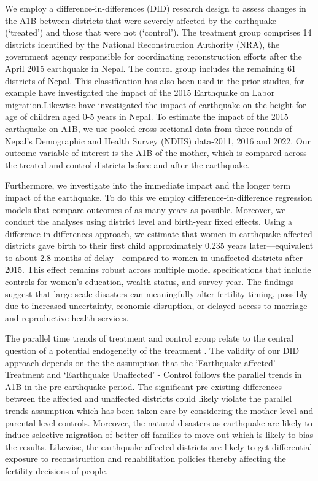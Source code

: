 \documentclass[11pt,a4paper]{article}
\begin{document}
We employ a difference-in-differences (DID) research design to assess changes in the A1B between districts that were severely affected by the earthquake (`treated') and those that were not (`control'). The treatment group comprises 14 districts identified by the National Reconstruction Authority (NRA), the government agency responsible for coordinating reconstruction efforts after the April 2015 earthquake in Nepal. The control group includes the remaining 61 districts of Nepal. This classification has also been used in the prior studies, for example \citet{shakya2022natural} have investigated the impact of the 2015 Earthquake on Labor migration.Likewise \citet{pun2023impact} have investigated the impact of earthquake on the height-for-age of children aged 0-5 years in Nepal. To estimate the impact of the 2015 earthquake on A1B, we use pooled cross-sectional data from three rounds of Nepal's Demographic and Health Survey (NDHS) data-2011, 2016 and 2022. Our outcome variable of interest is the A1B of the mother, which is compared across the treated and control districts before and after the earthquake. 

\vspace{0.25 cm}

Furthermore, we investigate into the immediate impact and the longer term impact of the earthquake. To do this we employ difference-in-difference regression models that compare outcomes of as many years as possible. Moreover, we conduct the analyses using district level and birth-year fixed effects. Using a difference-in-differences approach, we estimate that women in earthquake-affected districts gave birth to their first child approximately 0.235 years later—equivalent to about 2.8 months of delay—compared to women in unaffected districts after 2015. This effect remains robust across multiple model specifications that include controls for women’s education, wealth status, and survey year. The findings suggest that large-scale disasters can meaningfully alter fertility timing, possibly due to increased uncertainty, economic disruption, or delayed access to marriage and reproductive health services. 

\vspace{0.25cm}

The parallel time trends of treatment and control group relate to the central question of a potential endogeneity of the treatment \citep{Bassily_et_al_95, bertrand2004much}. The validity of our DID approach depends on the the assumption that the `Earthquake affected' -Treatment
and `Earthquake Unaffected' - Control follows the parallel trends in A1B in the pre-earthquake period. The significant pre-existing differences between the affected and unaffected districts could likely violate the parallel trends assumption which has been taken care by considering the mother level and parental level controls. Moreover, the natural disasters as earthquake are likely to induce selective migration of better off families to move out which is likely to bias the results. Likewise, the earthquake affected districts are likely to get differential exposure to reconstruction and rehabilitation policies thereby affecting the fertility decisions of people.
\end{document}
